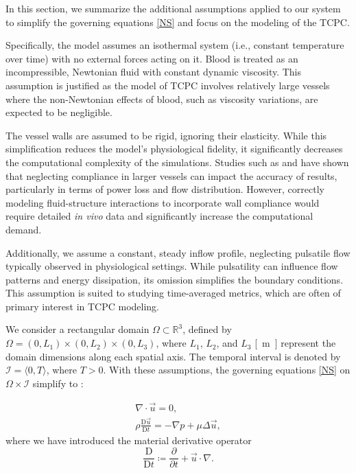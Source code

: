 In this section, we summarize the additional assumptions applied to our system to simplify the governing equations \eqref{NS} and focus on the modeling of the TCPC.

Specifically, the model assumes an isothermal system (i.e., constant temperature over time) with no external forces acting on it. Blood is treated as an incompressible, Newtonian fluid with constant dynamic viscosity. This assumption is justified as the model of TCPC involves relatively large vessels where the non-Newtonian effects of blood, such as viscosity variations, are expected to be negligible.

The vessel walls are assumed to be rigid, ignoring their elasticity. While this simplification reduces the model's physiological fidelity, it significantly decreases the computational complexity of the simulations. 
Studies such as \cite{Masters2004} and \cite{Orlando2006} have shown that neglecting compliance in larger vessels can impact the accuracy of results, particularly in terms of power loss and flow distribution. However, correctly modeling fluid-structure interactions to incorporate wall compliance would require detailed \textit{in vivo} data and significantly increase the computational demand.

Additionally, we assume a constant, steady inflow profile, neglecting pulsatile flow typically observed in physiological settings. While pulsatility can influence flow patterns and energy dissipation, its omission simplifies the boundary conditions. This assumption is suited to studying time-averaged metrics, which are often of primary interest in TCPC modeling.

We consider a rectangular domain $ \Omega \subset \mathbb{R}^3 $, defined by $ \Omega = (0, L_1) \times (0, L_2) \times (0, L_3) $, where $ L_1 $, $ L_2 $, and $ L_3 $ \si{[m]} represent the domain dimensions along each spatial axis. The temporal interval is denoted by $ \mathcal{I} = \langle 0, T \rangle $, where $ T > 0 $.
\newpage
With these assumptions, the governing equations \eqref{NS} on $ \Omega \times \mathcal{I} $ simplify to \cite{Schlichting}:

\begin{subequations}\label{NS s predpoklady}
	\begin{gather}
		\label{a s predpoklady}
		\nabla \cdot \vec{u} = 0, \\[5pt]
		\label{b s predpoklady}
		\rho \frac{\text{D} \vec{u}}{\text{D} t} = - \nabla p + \mu \Delta \vec{u},
	\end{gather}
\end{subequations}
where we have introduced the material derivative operator
\begin{equation}
	\dfrac{\text{D}}{\text{D} t} \coloneqq \dfrac{\partial}{\partial t} + \vec{u} \cdot \nabla.
\end{equation}

